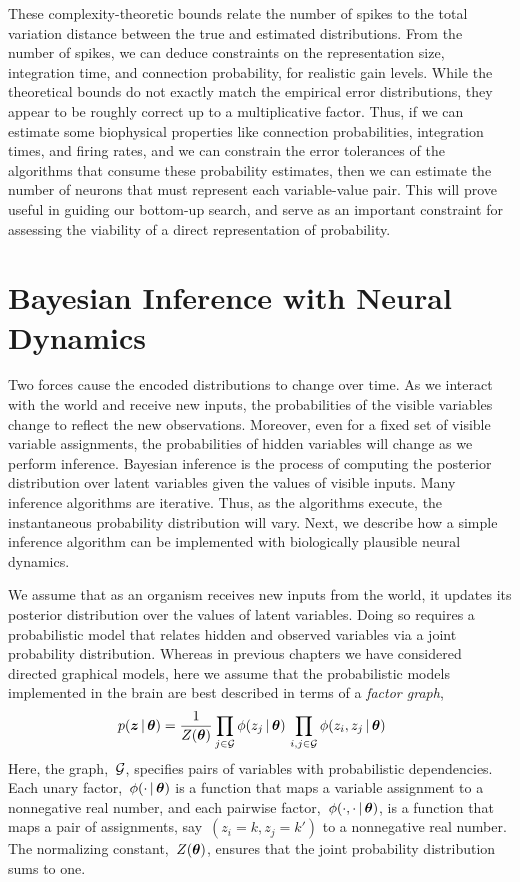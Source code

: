 These complexity-theoretic bounds relate the number of spikes to the 
total variation distance between the true and estimated distributions.
From the number of spikes, we can deduce constraints on the representation
size, integration time, and connection probability, for realistic gain levels.
While the theoretical bounds do not exactly match the empirical error 
distributions, they appear to be roughly correct up to a multiplicative 
factor. Thus, if we can estimate some biophysical properties like 
connection probabilities, integration times, and firing rates, 
and we can constrain the error 
tolerances of the algorithms that consume these probability estimates, 
then we can estimate the number of neurons that must represent 
each variable-value pair. This will prove useful in guiding our 
bottom-up search, and serve as an important constraint for assessing 
the viability of a direct representation of probability.


\section{Bayesian Inference with Neural Dynamics}
Two forces cause the encoded distributions to change over time. As
we interact with the world and receive new inputs, the probabilities
of the visible variables change to reflect the new
observations. Moreover, even for a fixed set of visible variable
assignments, the probabilities of hidden variables will change as we
perform inference. Bayesian inference is the process of computing the
posterior distribution over latent variables given the values of visible
inputs. Many inference algorithms are iterative. Thus, as the
algorithms execute, the instantaneous probability distribution will
vary. Next, we describe how a simple inference algorithm can be
implemented with biologically plausible neural dynamics.

We assume that as an organism receives new inputs from the world, it
updates its posterior distribution over the values of latent
variables. Doing so requires a probabilistic model that relates hidden
and observed variables via a joint probability distribution.  Whereas
in previous chapters we have considered directed graphical models,
here we assume that the probabilistic models implemented in the brain
are best described in terms of a \emph{factor graph},
\begin{align}
  \label{eq:probabilistic_model}
  p(\boldsymbol{z} \,|\, \boldsymbol{\theta}) &=
  \frac{1}{Z(\boldsymbol{\theta})}
  \prod_{j \in \mathcal{G}} \phi(z_j \,|\, \boldsymbol{\theta}) \,
  \prod_{i,j \in \mathcal{G}} \phi(z_i, z_j \,|\, \boldsymbol{\theta}) \,
\end{align}
Here, the graph,~$\mathcal{G}$, specifies pairs of variables with
probabilistic dependencies.  Each unary factor,~$\phi(\cdot \,|\,
\boldsymbol{\theta})$ is a function that maps a variable assignment to a
nonnegative real number, and each pairwise factor,~$\phi(\cdot, \cdot
\,|\, \boldsymbol{\theta})$, is a function that maps a pair of assignments,
say~${(z_i=k, z_j=k')}$ to a nonnegative real number. The
normalizing constant,~$Z(\boldsymbol{\theta})$, ensures that the joint probability
distribution sums to one.

